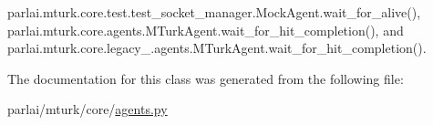 parlai.\+mturk.\+core.\+test.\+test\+\_\+socket\+\_\+manager.\+Mock\+Agent.\+wait\+\_\+for\+\_\+alive(), parlai.\+mturk.\+core.\+agents.\+M\+Turk\+Agent.\+wait\+\_\+for\+\_\+hit\+\_\+completion(), and parlai.\+mturk.\+core.\+legacy\+\_.\+agents.\+M\+Turk\+Agent.\+wait\+\_\+for\+\_\+hit\+\_\+completion().



The documentation for this class was generated from the following file\+:\begin{DoxyCompactItemize}
\item 
parlai/mturk/core/\hyperlink{parlai_2mturk_2core_2agents_8py}{agents.\+py}\end{DoxyCompactItemize}

